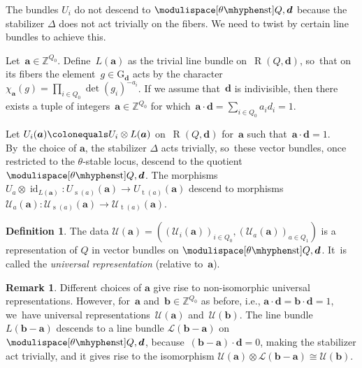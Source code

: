 \documentclass[JEP,XML,SOM,Unicode,NoEqCountersInSection,published]{cedram}
\theoremstyle{plain}
\theoremstyle{definition}
\newtheorem{definition}[theorem]{Definition}
\newtheorem{remark}[theorem]{Remark}
\DeclareMathOperator\Rep{R}
\DeclareMathOperator\source{s}
\DeclareMathOperator\target{t}
\newcommand\group[1][\tuple{d}]{\mathrm{G}_{#1}}
\newcommand\stable{\ensuremath{\mhyphen\mathrm{st}}}
\newcommand\tuple[1]{\ensuremath{{\boldsymbol{#1}}}}
\begin{document}
The bundles $U_i$ do not descend to $\modulispace[\theta\stable]{Q,\tuple{d}}$
because the stabilizer $\Delta$ does not act trivially on the fibers.
We need to twist by certain line bundles to achieve this.

Let~$\tuple{a} \in \mathbb{Z}^{Q_0}$.
Define~$L(\tuple{a})$ as the trivial line bundle on~$\Rep(Q,\tuple{d})$, so~that on its fibers the element~$g \in \group$ acts by
the character~$\chi_\tuple{a}(g) = \prod_{i \in Q_0} \det(g_i)^{-a_i}$.
If we assume that~$\tuple{d}$ is indivisible,
then there exists a tuple of integers~$\tuple{a} \in \mathbb{Z}^{Q_0}$
for which~$\tuple{a}\cdot\tuple{d}=\sum_{i \in Q_0}a_i d_i = 1$.

Let $U_i(\tuple{a}) \colonequals U_i \otimes L(\tuple{a})$ on~$\Rep(Q,\tuple{d})$
for~$\tuple{a}$ such that~$\tuple{a}\cdot\tuple{d}=1$. By~the choice of $\tuple{a}$, the stabilizer $\Delta$ acts trivially, so~these vector bundles, once restricted to the $\theta$-stable locus,
descend to the quotient~$\modulispace[\theta\stable]{Q,\tuple{d}}$.
The morphisms~$U_a \otimes \operatorname{id}_{L(\tuple{a})}\colon U_{\source(a)}(\tuple{a}) \to U_{\target(a)}(\tuple{a})$
descend to morphisms~$\mathcal{U}_a(\tuple{a})\colon \mathcal{U}_{\source(a)}(\tuple{a}) \to \mathcal{U}_{\target(a)}(\tuple{a})$.

\begin{definition}
The data $\mathcal{U}(\tuple{a}) = ((\mathcal{U}_i(\tuple{a}))_{i \in Q_0},(\mathcal{U}_a(\tuple{a}))_{a \in Q_1})$
is a representation of $Q$ in vector bundles on $\modulispace[\theta\stable]{Q,\tuple{d}}$. It~is called the \emph{universal representation} (relative to~$\tuple{a}$).
\end{definition}

\begin{remark}
\label{remark:uniqueness-up-to-twist-universal-bundle}
Different choices of $\tuple{a}$ give rise to non-isomorphic universal representations.
However, for~$\tuple{a}$ and~$\tuple{b} \in \mathbb{Z}^{Q_0}$ as before,
i.e., $\tuple{a}\cdot\tuple{d}=\tuple{b}\cdot\tuple{d}=1$, we~have universal representations~$\mathcal{U}(\tuple{a})$ and~$\mathcal{U}(\tuple{b})$.
The line bundle $L(\tuple{b} - \tuple{a})$
descends to a line bundle $\mathcal{L}(\tuple{b} - \tuple{a})$ on $\modulispace[\theta\stable]{Q,\tuple{d}}$,
because~$(\tuple{b}-\tuple{a})\cdot\tuple{d}=0$,
making the stabilizer act trivially,
and it gives rise to the isomorphism $\mathcal{U}(\tuple{a}) \otimes \mathcal{L}(\tuple{b} - \tuple{a}) \cong \mathcal{U}(\tuple{b})$.
\end{remark}
\end{document}
